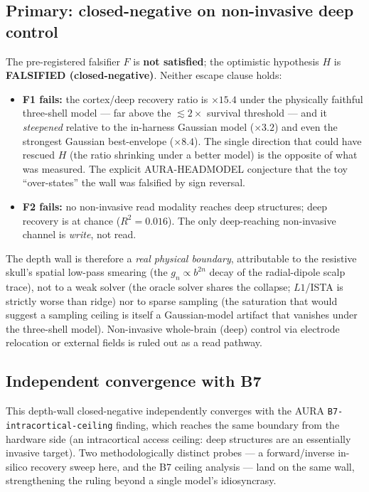 \documentclass[11pt]{article}
\newcommand{\Rsq}{R^{2}}
\newcommand{\redbox}[1]{\textcolor{red!70!black}{\textbf{#1}}}
\begin{document}
\subsection{Primary: closed-negative on non-invasive deep control}
The pre-registered falsifier $F$ is \redbox{not satisfied}; the optimistic
hypothesis $H$ is \redbox{FALSIFIED (closed-negative)}. Neither escape clause holds:
\begin{itemize}
  \item \textbf{F1 fails:} the cortex/deep recovery ratio is $\times 15.4$ under the
        physically faithful three-shell model --- far above the $\lesssim 2\times$
        survival threshold --- and it \emph{steepened} relative to the in-harness
        Gaussian model ($\times 3.2$) and even the strongest Gaussian best-envelope
        ($\times 8.4$). The single direction that could have rescued $H$ (the ratio
        shrinking under a better model) is the opposite of what was measured. The
        explicit AURA-HEADMODEL conjecture that the toy ``over-states'' the wall was
        falsified by sign reversal.
  \item \textbf{F2 fails:} no non-invasive read modality reaches deep structures;
        deep recovery is at chance ($\Rsq = 0.016$). The only deep-reaching
        non-invasive channel is \emph{write}, not read.
\end{itemize}
The depth wall is therefore a \emph{real physical boundary}, attributable to the
resistive skull's spatial low-pass smearing (the $g_n \propto b^{2n}$ decay of the
radial-dipole scalp trace), not to a weak solver (the oracle solver shares the
collapse; $L1$/ISTA is strictly worse than ridge) nor to sparse sampling (the
saturation that would suggest a sampling ceiling is itself a Gaussian-model artifact
that vanishes under the three-shell model). Non-invasive whole-brain (deep) control
via electrode relocation or external fields is ruled out as a read pathway.

\subsection{Independent convergence with B7}
This depth-wall closed-negative independently converges with the AURA
\texttt{B7-intracortical-ceiling} finding, which reaches the same boundary from the
hardware side (an intracortical access ceiling: deep structures are an essentially
invasive target). Two methodologically distinct probes --- a forward/inverse
in-silico recovery sweep here, and the B7 ceiling analysis --- land on the same wall,
strengthening the ruling beyond a single model's idiosyncrasy.
\end{document}
